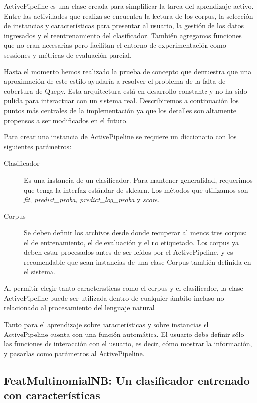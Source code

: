 ActivePipeline es una clase creada para simplificar la tarea del aprendizaje activo. Entre las actividades que realiza se encuentra la lectura de los corpus, la selección de instancias y características para presentar al usuario, la gestión de los datos ingresados y el reentrenamiento del clasificador. También agregamos funciones que no eran necesarias pero facilitan el entorno de experimentación como sessiones y métricas de evaluación parcial.

Hasta el momento hemos realizado la prueba de concepto que demuestra que una aproximación de este estilo ayudaría a resolver el problema de la falta de cobertura de Quepy. Esta arquitectura está en desarrollo constante y no ha sido pulida para interactuar con un sistema real. Describiremos a continuación los puntos más centrales de la implementación ya que los detalles son altamente propensos a ser modificados en el futuro.

Para crear una instancia de ActivePipeline se requiere un diccionario con los siguientes parámetros:
\begin{description}
	\item[Clasificador] Es una instancia de un clasificador. Para mantener generalidad, requerimos que tenga la interfaz estándar de sklearn. Los métodos que utilizamos son \textit{fit}, \textit{predict\_proba}, \textit{predict\_log\_proba} y \textit{score}.
	\item[Corpus] Se deben definir los archivos desde donde recuperar al menos tres corpus: el de entrenamiento, el de evaluación y el no etiquetado. Los corpus ya deben estar procesados antes de ser leídos por el ActivePipeline, y es recomendable que sean instancias de una clase Corpus también definida en el sistema.
\end{description}
Al permitir elegir tanto características como el corpus y el clasificador, la clase ActivePipeline puede ser utilizada dentro de cualquier ámbito incluso no relacionado al procesamiento del lenguaje natural.

Tanto para el aprendizaje sobre características y sobre instancias el ActivePipeline cuenta con una función automática. El usuario debe definir sólo las funciones de interacción con el usuario, es decir, cómo mostrar la información, y pasarlas como parámetros al ActivePipeline.

\subsection{FeatMultinomialNB: Un clasificador entrenado con características}

